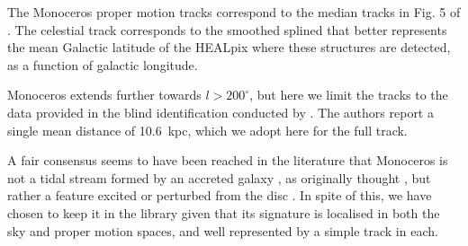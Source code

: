The Monoceros proper motion tracks correspond to the median tracks in Fig. 5 of \citet[][data provided by P. Ramos private communication]{Ramos2021}. The celestial track corresponds to the smoothed splined that better represents the mean Galactic latitude of the HEALpix where these structures are detected, as a function of galactic longitude. 

Monoceros extends further towards $l>200^\circ$, but here we limit the tracks to the data provided in the blind identification conducted by \citet{Ramos2021}. The authors report a single mean distance of 10.6~kpc, which we adopt here for the full track.

A fair consensus seems to have been reached in the literature that Monoceros is not a tidal stream formed by an accreted galaxy \citep[see review by][]{Yanny2016}, as originally thought \citep{Yanny2003}, but rather a feature excited or perturbed from the disc \citep{Kazantzidis2009,Laporte2019a,Laporte2019b}. In spite of this, we have chosen to keep it in the library given that its signature is localised in both the sky and proper motion spaces, and well represented by a simple track in each.
